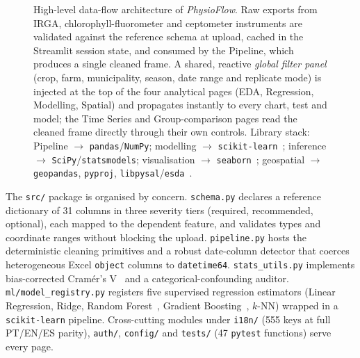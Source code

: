 \documentclass[preprint,12pt,a4paper]{elsarticle}
\begin{document}
\begin{figure}[!htb]
{%
}
\caption{High-level data-flow architecture of \emph{PhysioFlow}. Raw exports from IRGA, chlorophyll-fluorometer and ceptometer instruments are validated against the reference schema at upload, cached in the Streamlit session state, and consumed by the Pipeline, which produces a single cleaned frame. A shared, reactive \emph{global filter panel} (crop, farm, municipality, season, date range and replicate mode) is injected at the top of the four analytical pages (EDA, Regression, Modelling, Spatial) and propagates instantly to every chart, test and model; the Time Series and Group-comparison pages read the cleaned frame directly through their own controls. Library stack: Pipeline $\to$ \texttt{pandas}/\texttt{NumPy}; modelling $\to$ \texttt{scikit-learn}~\cite{Pedregosa2011}; inference $\to$ \texttt{SciPy}/\texttt{statsmodels}; visualisation $\to$ \texttt{seaborn}~\cite{Waskom2021,Hunter2007}; geospatial $\to$ \texttt{geopandas}, \texttt{pyproj}, \texttt{libpysal}/\texttt{esda}~\cite{Rey2010Pysal}.}\label{fig:architecture}
\end{figure}

The \texttt{src/} package is organised by concern. \texttt{schema.py} declares a reference dictionary of 31 columns in three severity tiers (required, recommended, optional), each mapped to the dependent feature, and validates types and coordinate ranges without blocking the upload. \texttt{pipeline.py} hosts the deterministic cleaning primitives and a robust date-column detector that coerces heterogeneous Excel \texttt{object} columns to \texttt{datetime64}. \texttt{stats\_utils.py} implements bias-corrected Cram\'er's V~\cite{Bergsma2013} and a categorical-confounding auditor. \texttt{ml/model\_registry.py} registers five supervised regression estimators (Linear Regression, Ridge, Random Forest~\cite{Breiman2001}, Gradient Boosting~\cite{Friedman2001}, $k$-NN) wrapped in a \texttt{scikit-learn} pipeline. Cross-cutting modules under \texttt{i18n/} (555 keys at full PT/EN/ES parity), \texttt{auth/}, \texttt{config/} and \texttt{tests/} (47 \texttt{pytest} functions) serve every page.
\end{document}
